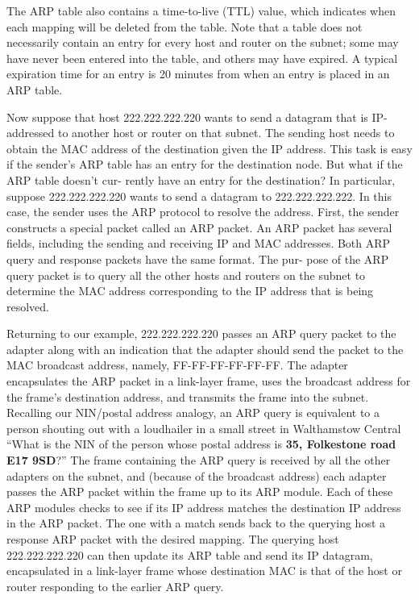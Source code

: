 \documentclass[a4paper,12pt]{book}
\begin{document}
The ARP table also contains a time-to-live (TTL) value, which indicates when each mapping will be deleted from the table. Note that a table does not necessarily contain an entry for every host and router on the subnet; some may have never been entered into the table, and others may have expired. A typical expiration time for an entry is 20 minutes from when an entry is placed in an ARP table.

Now suppose that host 222.222.222.220 wants to send a datagram that is IP-addressed to another host or router on that subnet. The sending host needs to obtain the MAC address of the destination given the IP address. This task is easy if the sender’s ARP table has an entry for the destination node. But what if the ARP table doesn’t cur-
rently have an entry for the destination? In particular, suppose 222.222.222.220 wants to send a datagram to 222.222.222.222. In this case, the sender uses the ARP protocol to resolve the address. First, the sender constructs a special packet called an ARP packet. An ARP packet has several fields, including the sending and receiving IP and MAC addresses. Both ARP query and response packets have the same format. The pur-
pose of the ARP query packet is to query all the other hosts and routers on the subnet
to determine the MAC address corresponding to the IP address that is being resolved.

Returning to our example, 222.222.222.220 passes an ARP query packet to the adapter along with an indication that the adapter should send the packet to the MAC broadcast address, namely, FF-FF-FF-FF-FF-FF. The adapter encapsulates the ARP packet in a link-layer frame, uses the broadcast address for the frame’s destination address, and transmits the frame into the subnet. Recalling our NIN/postal address analogy, an ARP query is equivalent to a person shouting out with a loudhailer in a small street in Walthamstow Central “What is the NIN of the person whose postal address is \textbf{35, Folkestone road E17 9SD}?” The frame containing the ARP query is received by all the other adapters on the subnet, and (because of the broadcast address) each adapter
passes the ARP packet within the frame up to its ARP module. Each of these ARP modules checks to see if its IP address matches the destination IP address in the ARP packet. The one with a match sends back to the querying host a response ARP packet with the desired mapping. The querying host 222.222.222.220 can then update its
ARP table and send its IP datagram, encapsulated in a link-layer frame whose destination MAC is that of the host or router responding to the earlier ARP query.
\end{document}
